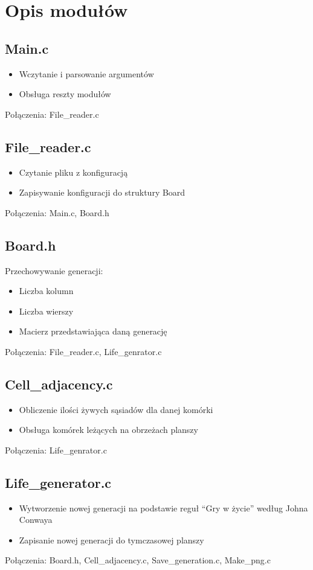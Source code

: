 \documentclass[12pt,a4paper,notitlepage]{report}
\begin{document}
\section{Opis modułów}

\subsection{Main.c}
\begin{itemize}
\item Wczytanie i parsowanie argumentów
\item Obsługa reszty modułów
\end{itemize}
Połączenia: File\_reader.c

\subsection{File\_reader.c}
\begin{itemize}
\item Czytanie pliku z konfiguracją
\item Zapisywanie konfiguracji do struktury Board
\end{itemize}
Połączenia: Main.c, Board.h

\subsection{Board.h}
Przechowywanie generacji:
\begin{itemize}
\item Liczba kolumn
\item Liczba wierszy
\item Macierz przedstawiająca daną generację
\end{itemize}
Połączenia: File\_reader.c, Life\_genrator.c

\subsection{Cell\_adjacency.c}
\begin{itemize}
\item Obliczenie ilości żywych sąsiadów dla danej komórki
\item Obsługa komórek leżących na obrzeżach planszy
\end{itemize}
Połączenia: Life\_genrator.c

\subsection{Life\_generator.c}
\begin{itemize}
\item Wytworzenie nowej generacji na podstawie reguł “Gry w życie” według Johna Conwaya
\item Zapisanie nowej generacji do tymczasowej planszy
	
\end{itemize}
Połączenia: Board.h, Cell\_adjacency.c, Save\_generation.c, Make\_png.c
\end{document}
